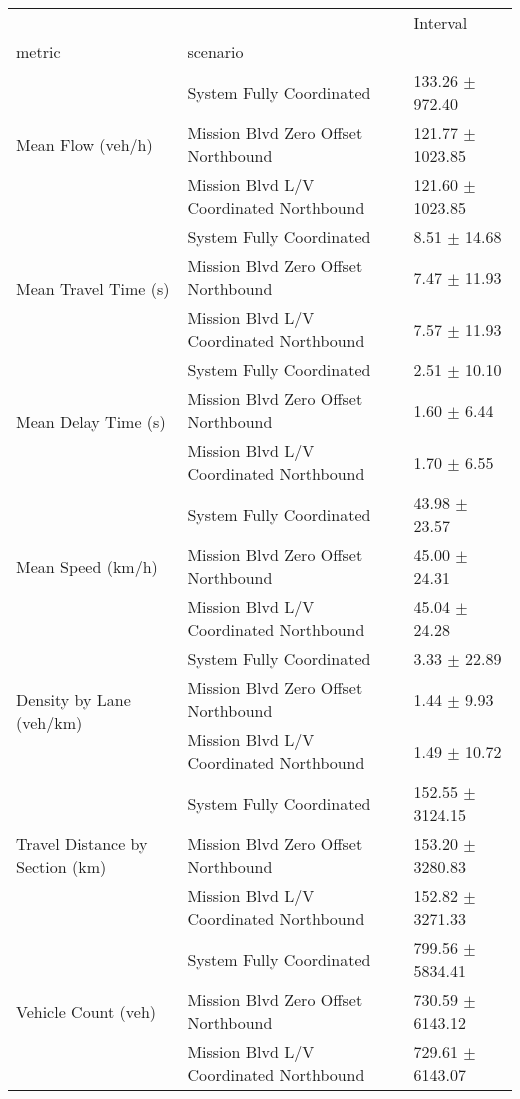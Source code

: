 \begin{tabular}{lll}
\toprule
 &  & Interval \\
metric & scenario &  \\
\midrule
\multirow[t]{3}{*}{Mean Flow (veh/h)} & System Fully Coordinated & 133.26 $\pm$ 972.40 \\
 & Mission Blvd Zero Offset Northbound & 121.77 $\pm$ 1023.85 \\
 & Mission Blvd L/V Coordinated Northbound & 121.60 $\pm$ 1023.85 \\
\multirow[t]{3}{*}{Mean Travel Time (s)} & System Fully Coordinated & 8.51 $\pm$ 14.68 \\
 & Mission Blvd Zero Offset Northbound & 7.47 $\pm$ 11.93 \\
 & Mission Blvd L/V Coordinated Northbound & 7.57 $\pm$ 11.93 \\
\multirow[t]{3}{*}{Mean Delay Time (s)} & System Fully Coordinated & 2.51 $\pm$ 10.10 \\
 & Mission Blvd Zero Offset Northbound & 1.60 $\pm$ 6.44 \\
 & Mission Blvd L/V Coordinated Northbound & 1.70 $\pm$ 6.55 \\
\multirow[t]{3}{*}{Mean Speed (km/h)} & System Fully Coordinated & 43.98 $\pm$ 23.57 \\
 & Mission Blvd Zero Offset Northbound & 45.00 $\pm$ 24.31 \\
 & Mission Blvd L/V Coordinated Northbound & 45.04 $\pm$ 24.28 \\
\multirow[t]{3}{*}{Density by Lane (veh/km)} & System Fully Coordinated & 3.33 $\pm$ 22.89 \\
 & Mission Blvd Zero Offset Northbound & 1.44 $\pm$ 9.93 \\
 & Mission Blvd L/V Coordinated Northbound & 1.49 $\pm$ 10.72 \\
\multirow[t]{3}{*}{Travel Distance by Section (km)} & System Fully Coordinated & 152.55 $\pm$ 3124.15 \\
 & Mission Blvd Zero Offset Northbound & 153.20 $\pm$ 3280.83 \\
 & Mission Blvd L/V Coordinated Northbound & 152.82 $\pm$ 3271.33 \\
\multirow[t]{3}{*}{Vehicle Count (veh)} & System Fully Coordinated & 799.56 $\pm$ 5834.41 \\
 & Mission Blvd Zero Offset Northbound & 730.59 $\pm$ 6143.12 \\
 & Mission Blvd L/V Coordinated Northbound & 729.61 $\pm$ 6143.07 \\
\bottomrule
\end{tabular}
